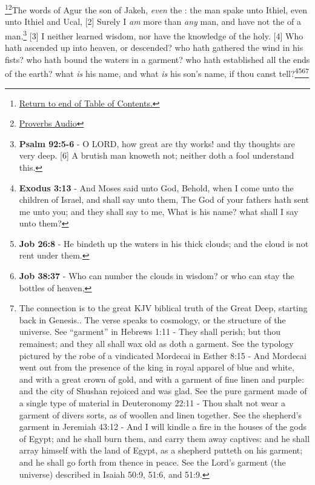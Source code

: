 \footnote{\textcolor[cmyk]{0.99998,1,0,0}{\hyperlink{TOC}{Return to end of Table of Contents.}}}\footnote{\href{https://www.audioverse.org/english/audiobibles/books/ENGKJV/O/Prov/1}{\textcolor[cmyk]{0.99998,1,0,0}{Proverbs Audio}}}\textcolor[cmyk]{0.99998,1,0,0}{The words of Agur the son of Jakeh, \emph{even} the : the man spake unto Ithiel, even unto Ithiel and Ucal,}
[2] \textcolor[cmyk]{0.99998,1,0,0}{Surely I \emph{am} more  than \emph{any} man, and have not the  of a man.}\footnote{\textbf{Psalm 92:5-6} - O LORD, how great are thy works! and thy thoughts are very deep. [6] A brutish man knoweth not; neither doth a fool understand this.}
[3] \textcolor[cmyk]{0.99998,1,0,0}{I neither learned wisdom, nor have the knowledge of the holy.}
[4] \textcolor[cmyk]{0.99998,1,0,0}{Who hath ascended up into heaven, or descended? who hath gathered the wind in his fists? who hath bound the waters in a garment? who hath established all the ends of the earth? what \emph{is} his name, and what \emph{is} his son's name, if thou canst tell?}\footnote{\textbf{Exodus 3:13} - And Moses said unto God, Behold, when I come unto the children of Israel, and shall say unto them, The God of your fathers hath sent me unto you; and they shall say to me, What is his name? what shall I say unto them?}\footnote{\textbf{Job 26:8} - He bindeth up the waters in his thick clouds; and the cloud is not rent under them.}\footnote{\textbf{Job 38:37} - Who can number the clouds in wisdom? or who can stay the bottles of heaven,}\footnote{The connection is to the great KJV biblical truth of the Great Deep, starting back in Genesis.. The verse speaks to cosmology, or the structure of the universe. See ``garment'' in Hebrews 1:11 - They shall perish; but thou remainest; and they all shall wax old as doth a garment. See the typology pictured by the robe of a vindicated Mordecai in Esther 8:15 - And Mordecai went out from the presence of the king in royal apparel of blue and white, and with a great crown of gold, and with a garment of fine linen and purple: and the city of Shushan rejoiced and was glad. See the pure garment made of a single type of material in Deuteronomy 22:11 - Thou shalt not wear a garment of divers sorts, as of woollen and linen together. See the shepherd's garment in Jeremiah 43:12 - And I will kindle a fire in the houses of the gods of Egypt; and he shall burn them, and carry them away captives: and he shall array himself with the land of Egypt, as a shepherd putteth on his garment; and he shall go forth from thence in peace.  See the Lord's garment (the universe) described in Isaiah 50:9, 51:6, and 51:9.}

